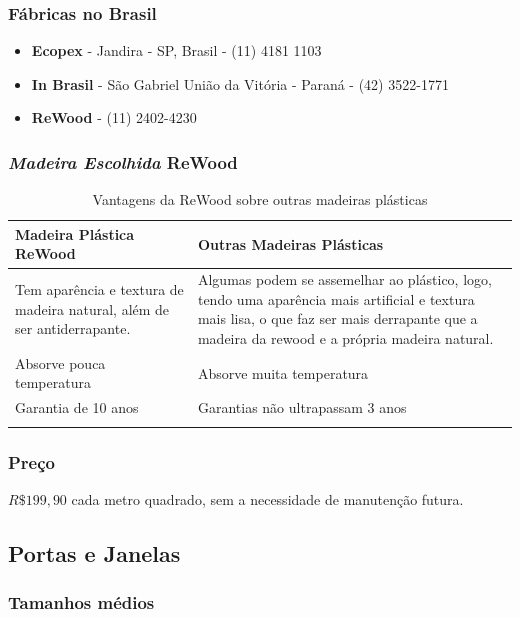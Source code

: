 \subsubsection*{\textbf{Fábricas no Brasil}}
	
	\begin{itemize}
		\item \textbf{Ecopex} - Jandira - SP, Brasil - (11) 4181 1103
		\item \textbf{In Brasil} - São Gabriel União da Vitória - Paraná - (42) 3522-1771
		\item \textbf{ReWood} - (11) 2402-4230
	\end{itemize}

\subsubsection*{\textit{Madeira Escolhida} \textbf{ReWood}}

\begin{longtable}{|m{7cm}|m{7cm}|}
\hline 
Madeira Plástica ReWood & Outras Madeiras Plásticas\tabularnewline
\hline 
\hline 
Tem aparência e textura de madeira natural, além de ser antiderrapante. & Algumas podem se assemelhar ao plástico, logo, tendo uma aparência mais artificial e textura mais lisa, o que faz ser mais derrapante que a madeira da rewood e a própria madeira natural.\tabularnewline
\hline 
Absorve pouca temperatura & Absorve muita temperatura\tabularnewline
\hline 
Garantia de 10 anos & Garantias não ultrapassam 3 anos\tabularnewline
\hline 
\caption{Vantagens da ReWood sobre outras madeiras plásticas}
\end{longtable}

\subsubsection*{\textbf{Preço}}

	$R\$199,90$ cada metro quadrado, sem a necessidade de manutenção futura\cite{BlogReWood}.

\subsection{Portas e Janelas}

\subsubsection*{\textbf{Tamanhos médios}}

